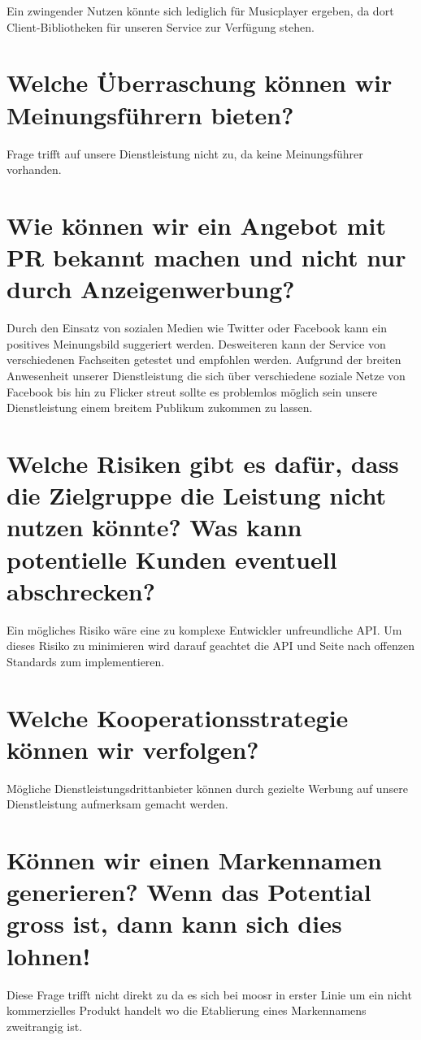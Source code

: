 \documentclass[11pt]{scrreprt}
\begin{document}
Ein zwingender Nutzen könnte sich lediglich für Musicplayer ergeben, da dort 
Client-Bibliotheken für unseren Service zur Verfügung stehen. 

\section{Welche Überraschung können wir
Meinungsführern bieten?}
Frage trifft auf unsere Dienstleistung nicht zu, da keine Meinungsführer
vorhanden.


\section{Wie können wir ein Angebot mit PR bekannt
    machen und nicht nur durch
Anzeigenwerbung?}

Durch den Einsatz von sozialen Medien wie Twitter oder Facebook kann ein
positives Meinungsbild suggeriert werden. Desweiteren kann der Service von
verschiedenen Fachseiten getestet und empfohlen werden. Aufgrund der breiten
Anwesenheit unserer Dienstleistung die sich über verschiedene soziale Netze
von Facebook bis hin zu Flicker streut sollte es problemlos möglich sein unsere
Dienstleistung einem breitem Publikum zukommen zu lassen.


\section{Welche Risiken gibt es dafür, dass die Zielgruppe
    die Leistung nicht nutzen könnte?
    Was kann potentielle Kunden eventuell
abschrecken?}
Ein mögliches Risiko wäre eine zu komplexe Entwickler unfreundliche API. Um
dieses Risiko zu minimieren wird darauf geachtet die API und Seite nach offenzen
Standards zum implementieren.

\section{Welche Kooperationsstrategie können wir
verfolgen?}
Mögliche Dienstleistungsdrittanbieter können durch gezielte Werbung auf unsere 
Dienstleistung aufmerksam gemacht werden.


\label{Markenname}\section{Können wir einen Markennamen generieren?
    Wenn das Potential gross ist, dann kann sich
dies lohnen!}
Diese Frage trifft nicht direkt zu da es sich bei moosr in erster Linie um ein
nicht kommerzielles Produkt handelt wo die Etablierung eines Markennamens
zweitrangig ist. 
\end{document}
